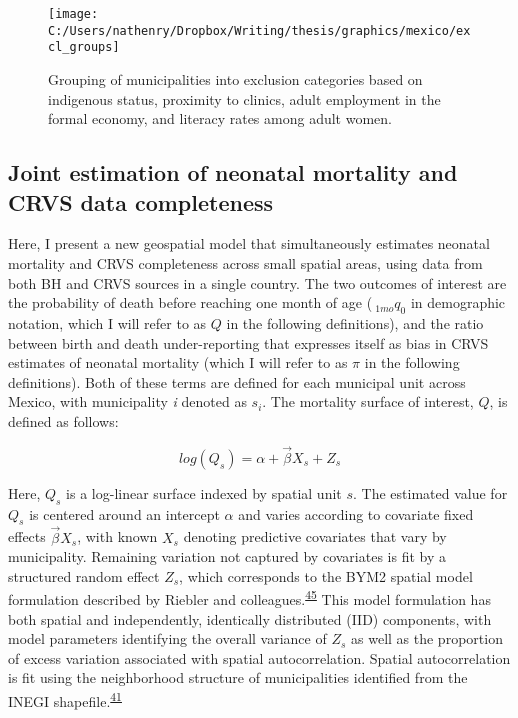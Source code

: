\documentclass[
]{article}
\begin{document}
\begin{figure}[!ht]

{\centering \texttt{[image: C:/Users/nathenry/Dropbox/Writing/thesis/graphics/mexico/excl\_groups]} 

}

\caption{Grouping of municipalities into exclusion categories based on indigenous status, proximity to clinics, adult employment in the formal economy, and literacy rates among adult women.}\label{fig:excl-groups}
\end{figure}

\hypertarget{joint-estimation-of-neonatal-mortality-and-crvs-data-completeness}{%
\subsection{Joint estimation of neonatal mortality and CRVS data completeness}\label{joint-estimation-of-neonatal-mortality-and-crvs-data-completeness}}

Here, I present a new geospatial model that simultaneously estimates neonatal mortality and CRVS completeness across small spatial areas, using data from both BH and CRVS sources in a single country. The two outcomes of interest are the probability of death before reaching one month of age (\(~_{1mo}q_0\) in demographic notation, which I will refer to as \(Q\) in the following definitions), and the ratio between birth and death under-reporting that expresses itself as bias in CRVS estimates of neonatal mortality (which I will refer to as \(\pi\) in the following definitions). Both of these terms are defined for each municipal unit across Mexico, with municipality \emph{i} denoted as \(s_i\). The mortality surface of interest, \(Q\), is defined as follows:

\[log(Q_s) = \alpha + \overrightarrow{\beta}X_s + Z_s\]

Here, \(Q_s\) is a log-linear surface indexed by spatial unit \(s\). The estimated value for \(Q_s\) is centered around an intercept \(\alpha\) and varies according to covariate fixed effects \(\overrightarrow{\beta}X_s\), with known \(X_s\) denoting predictive covariates that vary by municipality. Remaining variation not captured by covariates is fit by a structured random effect \(Z_s\), which corresponds to the BYM2 spatial model formulation described by Riebler and colleagues.\textsuperscript{\protect\hyperlink{ref-Riebler2016}{45}} This model formulation has both spatial and independently, identically distributed (IID) components, with model parameters identifying the overall variance of \(Z_s\) as well as the proportion of excess variation associated with spatial autocorrelation. Spatial autocorrelation is fit using the neighborhood structure of municipalities identified from the INEGI shapefile.\textsuperscript{\protect\hyperlink{ref-INEGI2010b}{41}}
\end{document}

